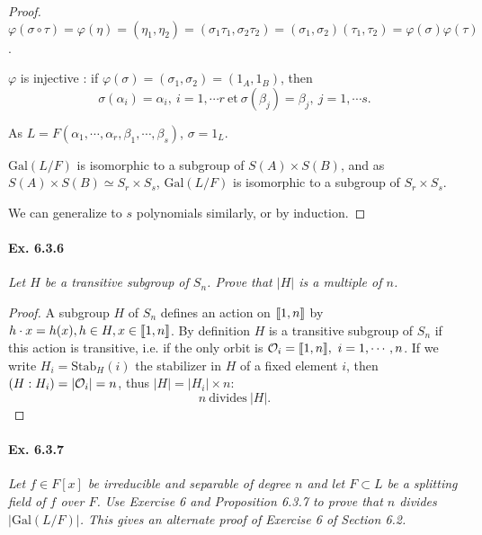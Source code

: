 \documentclass[11pt,a4paper]{article}
\def\gcro{\mbox{[\hspace{-.15em}[}}%
\def\dcro{\mbox{]\hspace{-.15em}]}}
\newcommand{\Gal}{\mathrm{Gal}}
\begin{document}
\begin{proof}
$\varphi(\sigma \circ \tau) = \varphi(\eta) = (\eta_1,\eta_2) = (\sigma_1  \tau_1, \sigma_2  \tau_2) = (\sigma_1, \sigma_2) (\tau_1,\tau_2) =  \varphi(\sigma)\varphi(\tau)$.

$\varphi$ is injective : if $\varphi(\sigma) = (\sigma_1,\sigma_2) = (1_A,1_B)$, then $$\sigma(\alpha_i) = \alpha_i,\ i=1,\cdots r \ \mathrm{et}\ \sigma(\beta_j) = \beta_j,\ j=1,\cdots s.$$

As $L=F(\alpha_1,\cdots,\alpha_{r}, \beta_1,\cdots,\beta_{s})$, $\sigma = 1_L$.

 $\Gal(L/F)$ is isomorphic to a subgroup of $S(A) \times S(B)$, and as $S(A)\times S(B) \simeq S_r\times S_s$,  $\Gal(L/F)$ is isomorphic to a subgroup of $S_r\times S_s$.

We can generalize to $s$ polynomials similarly, or by induction.
\end{proof}

\paragraph{Ex. 6.3.6}

{\it Let $H$ be a transitive subgroup of $S_n$. Prove that $|H|$ is a multiple of $n$.
}

\begin{proof}
A subgroup $H$ of $S_n$ defines an action on $\gcro 1,n \dcro$ by $h\cdot x = h(x), h\in H, x \in \gcro 1,n \dcro$. By definition $H$ is a transitive subgroup of $S_n$ if this action is transitive, i.e. if the only orbit is ${\cal O}_i =\gcro 1,n \dcro,\ i=1,\cdots,n$.
If we write $H_i = \mathrm{Stab}_H(i)$ the stabilizer in  $H$ of a fixed element $i$, then $(H:H_i) = \vert {\cal O}_i \vert =n$, thus $\vert H \vert = \vert H_i \vert \times n$:
$$n \ \mathrm{divides} \  \vert H \vert.$$
\end{proof}

\paragraph{Ex. 6.3.7}

{\it Let $f \in F[x]$ be irreducible and separable of degree $n$ and let $F\subset L$ be a splitting field of $f$ over $F$. Use Exercise 6 and Proposition 6.3.7 to prove that $n$ divides $|\Gal(L/F) |$. This gives an alternate proof of Exercise 6 of Section 6.2.
}
\end{document}
